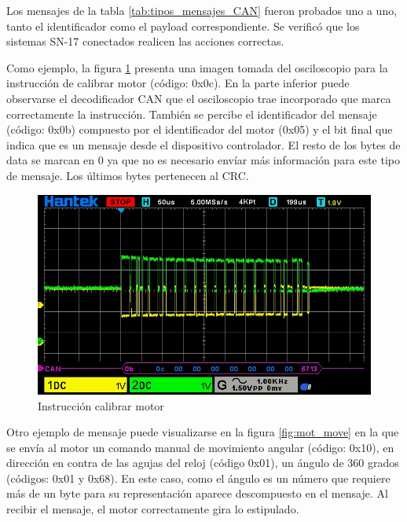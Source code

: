 Los mensajes de la tabla \ref{tab:tipos_mensajes_CAN} fueron probados uno a uno, tanto el identificador como el payload correspondiente. Se verificó que los sistemas SN-17 conectados realicen las acciones correctas.

Como ejemplo, la figura \ref{fig:mot_calib} presenta una imagen tomada del osciloscopio para la instrucción de calibrar motor (código: 0x0c). En la parte inferior puede observarse el decodificador CAN que el osciloscopio trae incorporado que marca correctamente la instrucción. También se percibe el identificador del mensaje (código: 0x0b) compuesto por el identificador del motor (0x05) y el bit final que indica que es un mensaje desde el dispositivo controlador. El resto de los bytes de data se marcan en 0 ya que no es necesario envíar más información para este tipo de mensaje. Los últimos bytes pertenecen al CRC.

\begin{figure}[htbp]
	\centering
	\includegraphics[scale=0.6]{./Figures/Motor_Calibrate.jpg}
	\caption{Instrucción calibrar motor}
	\label{fig:mot_calib}
\end{figure}

Otro ejemplo de mensaje puede visualizarse en la figura \ref{fig:mot_move} en la que se envía al motor un comando manual de movimiento angular (código: 0x10), en dirección en contra de las agujas del reloj (código 0x01), un ángulo de 360 grados (códigos: 0x01 y 0x68). En este caso, como el ángulo es un número que requiere más de un byte para su representación aparece descompuesto en el mensaje. Al recibir el mensaje, el motor correctamente gira lo estipulado.

